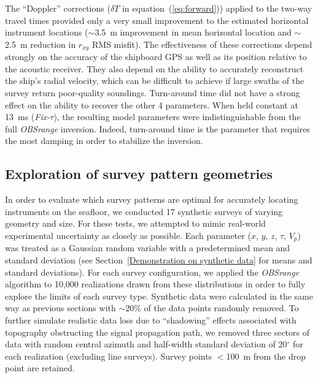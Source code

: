 The ``Doppler'' corrections ($\delta T$ in equation~(\ref{eq:forward})) applied to the two-way travel times provided only a very small improvement to the estimated horizontal instrument locations ($\sim$3.5~m improvement in mean horizontal location and $\sim$2.5~m reduction in $r_{xy}$ RMS misfit). The effectiveness of these corrections depend strongly on the accuracy of the shipboard GPS as well as its position relative to the acoustic receiver. They also depend on the ability to accurately reconstruct the ship's radial velocity, which can be difficult to achieve if large swaths of the survey return poor-quality soundings. Turn-around time did not have a strong effect on the ability to recover the other 4 parameters. When held constant at 13~ms (\textit{Fix-$\tau$}), the resulting model parameters were indistinguishable from the full \textit{OBSrange} inversion. Indeed, turn-around time is the parameter that requires the most damping in order to stabilize the inversion.


\subsection{Exploration of survey pattern geometries} \label{sec:surv_geom_tests}

In order to evaluate which survey patterns are optimal for accurately locating instruments on the seafloor, we conducted 17 synthetic surveys of varying geometry and size. For these tests, we attempted to mimic real-world experimental uncertainty as closely as possible. Each parameter ($x$, $y$, $z$, $\tau$, $V_p$) was treated as a Gaussian random variable with a predetermined mean and standard deviation (see Section~\ref{Demonstration on synthetic data} for means and standard deviations). For each survey configuration, we applied the \textit{OBSrange} algorithm to 10,000 realizations drawn from these distributions in order to fully explore the limits of each survey type. Synthetic data were calculated in the same way as previous sections with $\sim$20\% of the data points randomly removed. To further simulate realistic data loss due to ``shadowing'' effects associated with topography obstructing the signal propagation path, we removed three sectors of data with random central azimuth and half-width standard deviation of 20$^{\circ}$ for each realization (excluding line surveys). Survey points $<$100~m from the drop point are retained.


